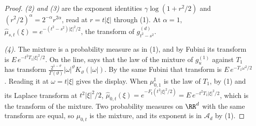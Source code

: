 \begin{proof}
\emph{(2) and (3)} are the exponent identities $\gamma\log(1 + r^2/2)$ and
$(r^2/2)^\alpha = 2^{-\alpha}r^{2\alpha}$, read at $r = t|\xi|$ through (1). At $\alpha = 1$,
$\widehat\mu_{s,t}(\xi) = e^{-(t^2-s^2)|\xi|^2/2}$, the transform of $g^{(d)}_{t^2-s^2}$.

\emph{(4).} The mixture is a probability measure as in (1), and by Fubini its transform is
$E\,e^{-t^2T_1|\xi|^2/2}$. On the line,  says that the law of the mixture of
$g^{(1)}_u$ against $T_1$ has transform
$\tfrac{2^{1-\vartheta}}{\Gamma(\vartheta)}|\omega|^\vartheta K_\vartheta(|\omega|)$. By the
same Fubini that transform is $E\,e^{-T_1\omega^2/2}$. Reading it at $\omega = t|\xi|$ gives the
display. When $\mu^{\mathrm I}_{0,1}$ is the law of $T_1$, by (1) and its Laplace transform at
$t^2|\xi|^2/2$, $\widehat\mu_{0,t}(\xi) = e^{-F_{\mathrm I}(t^2|\xi|^2/2)} = E\,e^{-t^2T_1|\xi|^2/2}$,
which is the transform of the mixture. Two probability measures on $\RR^d$ with the same
transform are equal, so $\mu_{0,t}$ is the mixture, and its exponent is in $\mathcal{A}_d$ by (1).
\end{proof}

